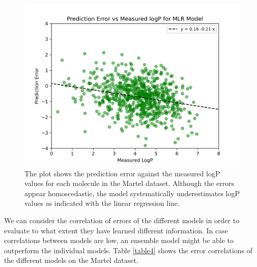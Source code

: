 \documentclass{article}
\theoremstyle{definition}
\theoremstyle{remark}
\begin{document}
\begin{figure}[hp]
\centering
\captionsetup{width=0.8\textwidth}
\includegraphics[width=\textwidth]{./../plots/martel_errors_mlr.png}
\caption{The plot shows the prediction error against the measured logP values for each molecule in the Martel dataset. Although the errors appear homoscedastic, the model systematically underestimates logP values as indicated with the linear regression line.}
\end{figure}

We can consider the correlation of errors of the different models in order to evaluate to what extent they have learned different information. In case correlations between models are low, an ensemble model might be able to outperform the individual models. Table \ref{table4} shows the error correlations of the different models on the Martel dataset.\\
\end{document}
